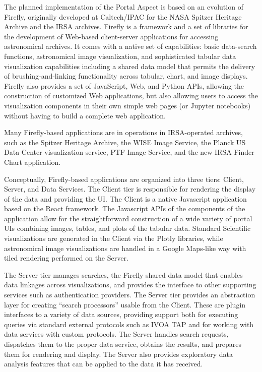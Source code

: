 
The planned implementation of the Portal Aspect is based on an evolution of Firefly, originally developed at Caltech/IPAC for the NASA Spitzer Heritage Archive and the IRSA archives.
Firefly is a framework and a set of libraries for the development of Web-based client-server applications for accessing astronomical archives.
It comes with a native set of capabilities: basic data-search functions, astronomical image visualization, and sophisticated tabular data visualization capabilities including a shared data model that permits the delivery of brushing-and-linking functionality across tabular, chart, and image displays.
Firefly also provides a set of JavaScript, Web, and Python APIs, allowing the construction of customized Web applications, but also allowing users to access the visualization components in their own simple web pages (or Jupyter notebooks) without having to build a complete web application.

Many Firefly-based applications are in operations in IRSA-operated archives, such as the Spitzer Heritage Archive, the WISE Image Service, the Planck US Data Center visualization service, PTF Image Service, and the new IRSA Finder Chart application.

Conceptually, Firefly-based applications are organized into three tiers: Client, Server, and Data Services.
The Client tier is responsible for rendering the display of the data and providing the UI.
The Client is a native Javascript application based on the React framework.
The Javascript APIs of the components of the application allow for the straightforward construction of a wide variety of portal UIs combining images, tables, and plots of the tabular data.
Standard Scientific visualizations are generated in the Client via the Plotly libraries, while astronomical image visualizations are handled in a Google Maps-like way with tiled rendering performed on the Server.

The Server tier manages searches, the Firefly shared data model that enables data linkages across visualizations, and provides the interface to other supporting services such as authentication providers.
The Server tier provides an abstraction layer for creating ``search processors'' usable from the Client.
These are plugin interfaces to a variety of data sources, providing support both for executing queries via standard external protocols such as IVOA TAP and for working with data services with custom protocols.
The Server handles search requests, dispatches them to the proper data service, obtains the results,
and prepares them for rendering and display.
The Server also provides exploratory data analysis features that can be applied to the data it has received.

